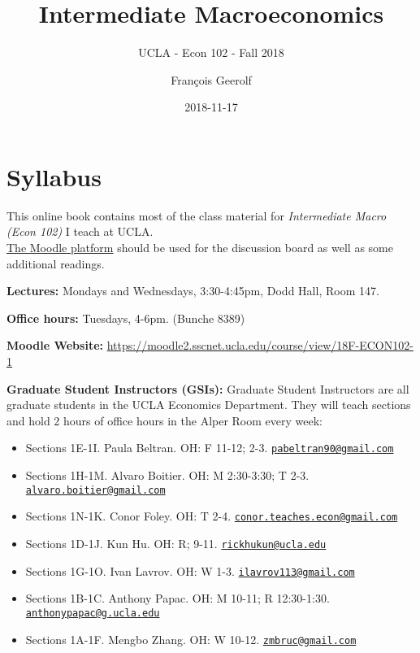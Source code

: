 \documentclass[]{book}
\title{Intermediate Macroeconomics}
\subtitle{UCLA - Econ 102 - Fall 2018}
\author{François Geerolf}
\date{2018-11-17}
\providecommand{\tightlist}{%
  \setlength{\itemsep}{0pt}\setlength{\parskip}{0pt}}
\theoremstyle{definition}
\theoremstyle{definition}
\theoremstyle{definition}
\theoremstyle{remark}
\begin{document}
\maketitle

{
\setcounter{tocdepth}{1}
\tableofcontents
}
\chapter*{Syllabus}\label{syllabus}

This online book contains most of the class material for
\emph{Intermediate Macro (Econ 102)} I teach at UCLA.\\
\href{https://moodle2.sscnet.ucla.edu/course/view/18F-ECON102-1}{The
Moodle platform} should be used for the discussion board as well as some
additional readings.

\textbf{Lectures:} Mondays and Wednesdays, 3:30-4:45pm, Dodd Hall, Room
147.

\textbf{Office hours:} Tuesdays, 4-6pm. (Bunche 8389)

\textbf{Moodle Website:}
\url{https://moodle2.sscnet.ucla.edu/course/view/18F-ECON102-1}

\textbf{Graduate Student Instructors (GSIs):} Graduate Student
Instructors are all graduate students in the UCLA Economics Department.
They will teach sections and hold 2 hours of office hours in the Alper
Room every week:

\begin{itemize}
\tightlist
\item
  Sections 1E-1I. Paula Beltran. OH: F 11-12; 2-3.
  \href{mailto:pabeltran90@gmail.com}{\nolinkurl{pabeltran90@gmail.com}}
\item
  Sections 1H-1M. Alvaro Boitier. OH: M 2:30-3:30; T 2-3.
  \href{mailto:alvaro.boitier@gmail.com}{\nolinkurl{alvaro.boitier@gmail.com}}
\item
  Sections 1N-1K. Conor Foley. OH: T 2-4.
  \href{mailto:conor.teaches.econ@gmail.com}{\nolinkurl{conor.teaches.econ@gmail.com}}
\item
  Sections 1D-1J. Kun Hu. OH: R; 9-11.
  \href{mailto:rickhukun@ucla.edu}{\nolinkurl{rickhukun@ucla.edu}}
\item
  Sections 1G-1O. Ivan Lavrov. OH: W 1-3.
  \href{mailto:ilavrov113@gmail.com}{\nolinkurl{ilavrov113@gmail.com}}
\item
  Sections 1B-1C. Anthony Papac. OH: M 10-11; R 12:30-1:30.
  \href{mailto:anthonypapac@g.ucla.edu}{\nolinkurl{anthonypapac@g.ucla.edu}}
\item
  Sections 1A-1F. Mengbo Zhang. OH: W 10-12.
  \href{mailto:zmbruc@gmail.com}{\nolinkurl{zmbruc@gmail.com}}
\end{itemize}
\end{document}
